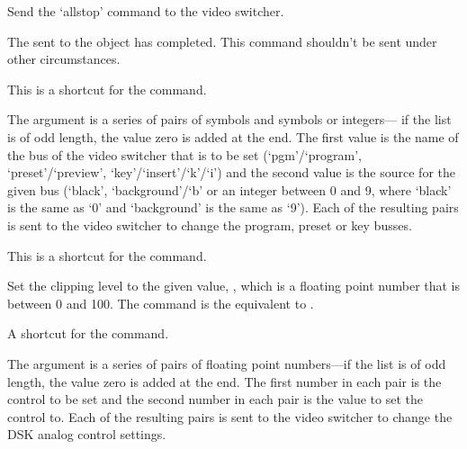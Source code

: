 
  \objListIOEnd






\objItemCommands[]

  \objListCmdBegin
  
  Send the `allstop' command to the video switcher.

  The  sent to the  object has completed.
  This command shouldn't be sent under other circumstances.

  This is a shortcut for the  command.

  The argument  is a series of pairs of symbols and symbols or integers---
  if the list is of odd length, the value zero is added at the end.
  The first value is the name of the bus of the video switcher that is to be set (`pgm'/`program',
  `preset'/`preview', `key'/`insert'/`k'/`i') and the second value is the source for the given bus
  (`black', `background'/`b' or an integer between 0 and 9, where `black' is the same as `0' and
  `background' is the same as `9').
  Each of the resulting pairs is sent to the video switcher to change the program, preset or key busses.

  This is a shortcut for the  command.

  Set the clipping level to the given value, , which is a floating point number
  that is between 0 and 100.
  The command is the equivalent to .

  A shortcut for the  command.

  The argument  is a series of pairs of floating point numbers---if the
  list is of odd length, the value zero is added at the end.
  The first number in each pair is the control to be set and the second number in each pair is the
  value to set the control to.
  Each of the resulting pairs is sent to the video switcher to change the DSK analog control settings.

